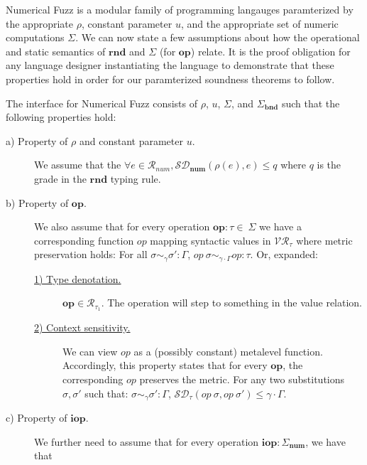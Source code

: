 Numerical Fuzz is a modular family of programming langauges paramterized by the
appropriate $\rho$, constant parameter $u$, and the appropriate set of numeric
computations $\Sigma$.  
We can now state a few assumptions about how the operational and static
semantics of $\mathbf{rnd}$ and $\Sigma$ (for $\mathbf{op}$) relate.
It is the proof obligation for any language designer instantiating the language
to demonstrate that these properties hold in order for our paramterized
soundness theorems to follow.
\begin{definition}
  \label{def:numfuzz-interface}
  The interface for Numerical Fuzz consists of $\rho$, $u$, $\Sigma$, and
  $\Sigma_{\mathbf{bnd}}$ such that the following properties hold: 
\begin{description}
  \item[a) Property of $\rho$ and constant parameter $u$.] We assume that the
    $\forall e \in \mathcal{R}_{num}, \mathcal{SD}_{\mathbf{num}}(\rho(e), e)
    \leq q$ where $q$ is the grade in the $\mathbf{rnd}$ typing rule.
  \item[b) Property of $\mathbf{op}$.] We also assume that for every operation
    $\mathbf{op} : \tau \in \ \Sigma$ we have a
    corresponding function $op$ mapping syntactic values in
    $\mathcal{VR}_{\tau}$ where metric preservation holds: For all $\sigma
    \sim_{\gamma} \sigma' : \Gamma$, $\textit{op}~\sigma \sim_{\gamma \cdot
    \Gamma} \textit{op} : \tau$.
    Or, expanded:
    \begin{description}
      \item[\underline{1) Type denotation.}] $\mathbf{op} \in
        \mathcal{R}_{\tau_1}$. The operation will step to something in the
        value relation.
      \item[\underline{2) Context sensitivity.}]
        We can view $\textit{op}$ as a (possibly constant) metalevel function.
        Accordingly, this property states that for every $\textbf{op}$, the
        corresponding $\textit{op}$ preserves the metric. For any two
        substitutions $\sigma, \sigma'$ such that:
        $\sigma \sim_{\gamma} \sigma' : \Gamma$, 
        $\mathcal{SD}_{\tau}(\textit{op}~\sigma, \textit{op}~\sigma') \leq \gamma \cdot \Gamma$.
    \end{description}
  \item[c) Property of $\mathbf{iop}$.] We further need to assume that for every
    operation $\mathbf{iop} : \Sigma_\textbf{num}$, we have that 
\end{description}
\end{definition}

